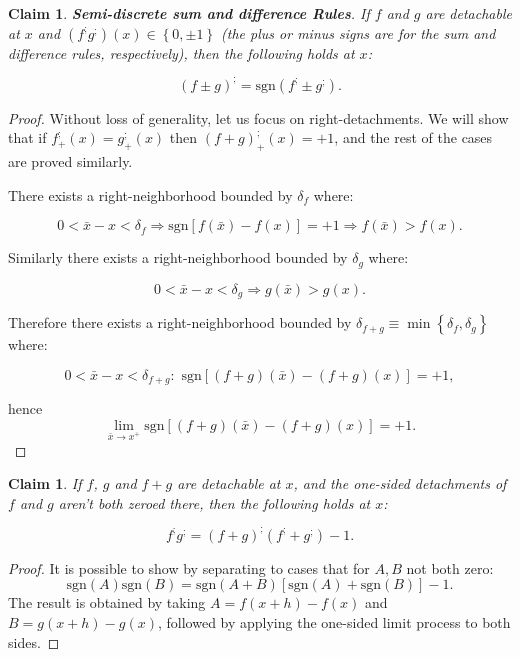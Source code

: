 \documentclass[11pt]{book}
\newtheorem{clm}[thm]{Claim}
\begin{document}
\begin{clm}\label{sum_rule}\textbf{Semi-discrete sum and difference Rules}. If $f$ and $g$ are detachable at $x$ and $\left(f^{;} g^{;} \right) \left(x\right) \in \left\{0, \pm 1 \right \}$ (the plus or minus signs are for the sum and difference rules, respectively), then the following holds at $x$:

$$\left(f \pm g\right)^{;}=\text{sgn}\left( f^{;} \pm g^{;} \right).$$
\label{sum_rule}
\end{clm}

\begin{proof}Without loss of generality, let us focus on right-detachments. We will show that if $f^{;}_{+}\left(x\right)=g^{;}_{+}\left(x\right)$ then $\left(f+g\right)^{;}_{+}\left(x\right)=+1$, and the rest of the cases are proved similarly.

There exists a right-neighborhood bounded by $\delta_{f}$ where:

$$0<\bar{x}-x<\delta_{f}\Longrightarrow \text{sgn}\left[f\left(\bar{x}\right)-f\left(x\right)\right]=+1\Longrightarrow f\left(\bar{x}\right) > f\left(x\right).$$

Similarly there exists a right-neighborhood bounded by $\delta_{g}$ where:

$$0<\bar{x}-x<\delta_{g}\Longrightarrow g\left(\bar{x}\right) > g\left(x\right).$$

Therefore there exists a right-neighborhood bounded by $\delta_{f+g}\equiv\min\left\{ \delta_{f},\delta_{g}\right\}$ where:

$$0<\bar{x}-x<\delta_{f+g}:\,\, \text{sgn}\left[\left(f+g\right)\left(\bar{x}\right)-\left(f+g\right)\left(x\right)\right]=+1,$$

hence $$\underset{\bar{x}\rightarrow x^{+}}{\lim}\text{sgn}\left[\left(f+g\right)\left(\bar{x}\right)-\left(f+g\right)\left(x\right)\right]=+1.$$\end{proof}

\begin{clm}If $f$, $g$ and $f+g$ are detachable at $x$, and the one-sided detachments of $f$ and $g$ aren’t both zeroed there, then the following holds at $x$:

$$f^{;}g^{;}=\left(f+g\right)^{;}\left(f^{;}+g^{;}\right)-1.$$
\end{clm}

\begin{proof}It is possible to show by separating to cases that for $A,B$ not both zero:$$\text{sgn}\left(A\right)\text{sgn}\left(B\right)=\text{sgn}\left(A+B\right)\left[\text{sgn}\left(A\right)+\text{sgn}\left(B\right)\right]-1.$$The result is obtained by taking $A=f\left(x+h\right)-f\left(x\right)$ and $B=g\left(x+h\right)-g\left(x\right)$, followed by applying the one-sided limit process to both sides.
\end{proof}
\end{document}
